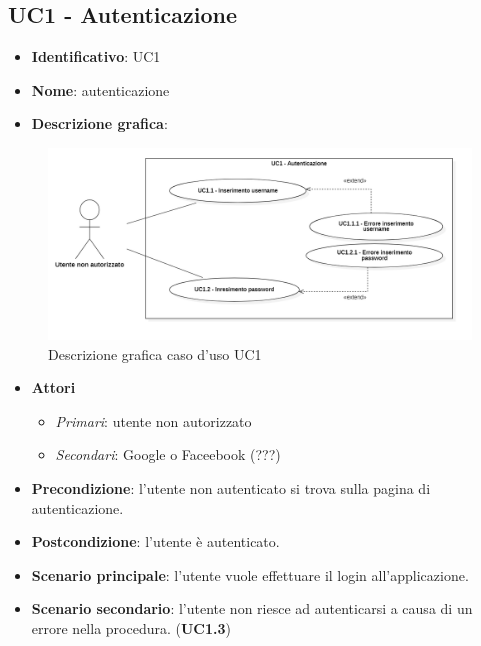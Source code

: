 
\subsection{UC1 - Autenticazione}
\begin{itemize}
  \item \textbf{Identificativo}: UC1
  \item \textbf{Nome}: autenticazione
  \item \textbf{Descrizione grafica}:
\end{itemize}

\begin{figure}[H]
  \centering
  \includegraphics[width=\textwidth]{immagini/usecase/UC1.png}
  \caption{Descrizione grafica caso d'uso UC1}
\end{figure}

\begin{itemize}
  \item \textbf{Attori}
        \begin{itemize}
          \item \textit{Primari}: utente non autorizzato
          \item \textit{Secondari}: Google o Faceebook (???)
        \end{itemize}
  \item \textbf{Precondizione}: l'utente non autenticato si trova sulla pagina di autenticazione.
  \item \textbf{Postcondizione}: l'utente è autenticato.
  \item \textbf{Scenario principale}: l'utente vuole effettuare il login all'applicazione.
  \item \textbf{Scenario secondario}: l'utente non riesce ad autenticarsi a causa di un errore nella procedura. (\textbf{UC1.3})
\end{itemize}


